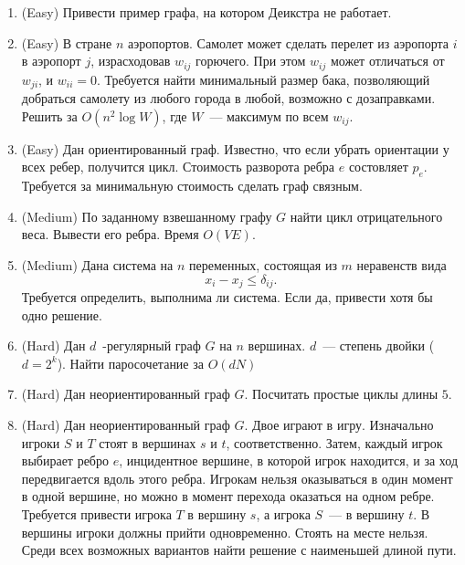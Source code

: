 \section{}

\begin{enumerate}

	\item (Easy) Привести пример графа, на котором Деикстра не работает.
	
	\item (Easy) В стране $n$ аэропортов. Самолет может сделать перелет 
	  из аэропорта $i$ в аэропорт $j$, израсходовав $w_{ij}$ горючего.
	  При этом $w_{ij}$ может отличаться от $w_{ji}$, и $w_{ii} = 0$.
	  Требуется найти минимальный размер бака, позволяющий добраться
	  самолету из любого города в любой, возможно с дозаправками.
	  Решить за $O(n^2 \log W)$, где $W$~--- максимум по всем $w_{ij}$.

	\item (Easy) Дан ориентированный граф. Известно, что если убрать ориентации
	  у всех ребер, получится цикл. Стоимость разворота ребра $e$ состовляет
	  $p_e$. Требуется за минимальную стоимость сделать граф связным.

	\item (Medium) По заданному взвешанному графу $G$ найти цикл отрицательного
	  веса. Вывести его ребра. Время $O(VE)$.

	\item (Medium) Дана система на $n$ переменных, состоящая из $m$ неравенств
	  вида
	  $$
	  	x_i - x_j \leq \delta_{ij}.
	  $$
	  Требуется определить, выполнима ли система. Если да, привести хотя
	  бы одно решение.

    \item (Hard) Дан $d$~-регулярный граф $G$ на $n$ вершинах. 
	  $d$~--- степень двойки ($d = 2^k$). Найти паросочетание 
	  за $O(dN)$
	 
    \item (Hard) Дан неориентированный граф $G$. Посчитать
	  простые циклы длины $5$.

	\item (Hard) Дан неориентированный граф $G$. Двое играют
	  в игру. Изначально игроки $S$ и $T$ стоят в вершинах $s$ и $t$, соответственно. 
	  Затем, каждый игрок выбирает ребро $e$, инцидентное вершине, в которой
	  игрок находится, и за ход передвигается вдоль этого ребра.
	  Игрокам нельзя оказываться в один момент в одной вершине, но
	  можно в момент перехода оказаться на одном ребре. Требуется
	  привести игрока $T$ в вершину $s$, а игрока $S$~--- в вершину
	  $t$. В вершины игроки должны прийти одновременно. Стоять на месте
	  нельзя. Среди всех возможных вариантов найти решение с наименьшей
	  длиной пути.
	

\end{enumerate}
